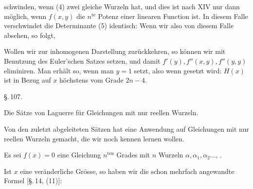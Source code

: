 schwinden, wenn (4) zwei gleiche Wurzeln hat, und dies ist nach XIV nur dann
möglich, wenn $f(x,y)$ die $n^{\mathrm{te}}$ Potenz einer linearen Function
ist. In diesem Falle verschwindet die Determinante (5) identisch: Wenn wir
also von diesem Falle absehen, so folgt, 

Wollen wir zur inhomogenen Darstellung zurückkehren, so können wir mit
Benutzung des Euler'schen Satzes
setzen, und damit $f'(y), f''(x,y), f''(y,y)$ eliminiren. Man erhält so,
wenn man $y = 1$ setzt,
also wenn
gesetzt wird:
$H(x)$ ist in Bezug auf $x$ höchstens vom Grade $2n-4$.

\begin{center}
\S.\,107.

Die Sätze von Laguerre für Gleichungen mit nur reellen Wurzeln.
\end{center}

Von den zuletzt abgeleiteten Sätzen hat  eine Anwendung
auf Gleichungen mit nur reellen Wurzeln gemacht, die wir noch kennen lernen
wollen.

Es sei $f(x) = 0$ eine Gleichung $n^{\mathrm{ten}}$ Grades mit $n$ 
Wurzeln $\alpha, \alpha_1, \alpha_2 \dots$, .

Ist $x$ eine veränderliche Grösse, so haben wir die schon mehrfach
angewandte Formel [\S.\,14, (11)]:
